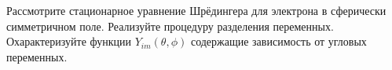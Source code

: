 \documentclass[__main__.tex]{subfiles}
\begin{document}
Рассмотрите стационарное уравнение Шрёдингера для электрона в сферически симметричном поле. Реализуйте процедуру разделения переменных. Охарактеризуйте функции $Y_{im}(\theta,\phi)$ содержащие зависимость от угловых переменных.\\ 

\end{document}
